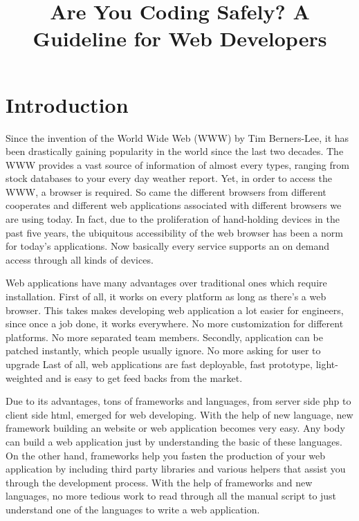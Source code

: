 \documentclass[conference]{IEEEtran}
\begin{document}
\title{Are You Coding Safely? A Guideline for Web Developers}

\author{
\and
{}
}





\maketitle

\section{Introduction}
Since the invention of the World Wide Web (WWW) by Tim Berners-Lee, it has been drastically gaining popularity in the world since the last two decades. The WWW provides a vast source of information of almost every types, ranging from stock databases to your every day weather report. Yet, in order to access the WWW, a browser is required. So came the different browsers from different cooperates and different web applications associated with different browsers we are using today. In fact, due to the proliferation of hand-holding devices in the past five years, the ubiquitous accessibility of the web browser has been a norm for today's applications. Now basically every service supports an on demand access through all kinds of devices.

Web applications have many advantages over traditional ones which require installation. First of all, it works on every platform as long as there's a web browser. This takes makes developing web application a lot easier for engineers, since once a job done, it works everywhere. No more customization for different platforms. No more separated team members. Secondly, application can be patched instantly, which people usually ignore. No more asking for user to upgrade Last of all, web applications are fast deployable, fast prototype, light-weighted and is easy to get feed backs from the market.

Due to its advantages, tons of frameworks and languages, from server side php to client side html, emerged for web developing. With the help of new language, new framework building an website or web application becomes very easy. Any body can build a web application just by understanding the basic of these languages. On the other hand, frameworks help you fasten the production of your web application by including third party libraries and various helpers that assist you through the development process. With the help of frameworks and new languages, no more tedious work to read through all the manual script to just understand one of the languages to write a web application.
\end{document}
